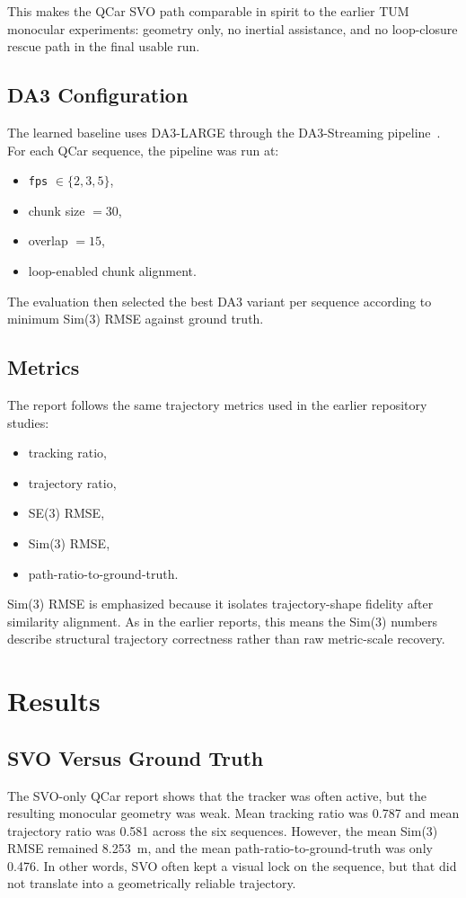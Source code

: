 \documentclass[conference]{IEEEtran}
\begin{document}
This makes the QCar SVO path comparable in spirit to the earlier TUM monocular experiments: geometry only, no inertial assistance, and no loop-closure rescue path in the final usable run.

\subsection{DA3 Configuration}
The learned baseline uses DA3-LARGE through the DA3-Streaming pipeline~\cite{lin2025depthanything3}. For each QCar sequence, the pipeline was run at:
\begin{itemize}
\item \texttt{fps} $\in \{2,3,5\}$,
\item chunk size $= 30$,
\item overlap $= 15$,
\item loop-enabled chunk alignment.
\end{itemize}

The evaluation then selected the best DA3 variant per sequence according to minimum Sim(3) RMSE against ground truth.

\subsection{Metrics}
The report follows the same trajectory metrics used in the earlier repository studies:
\begin{itemize}
\item tracking ratio,
\item trajectory ratio,
\item SE(3) RMSE,
\item Sim(3) RMSE,
\item path-ratio-to-ground-truth.
\end{itemize}

Sim(3) RMSE is emphasized because it isolates trajectory-shape fidelity after similarity alignment. As in the earlier reports, this means the Sim(3) numbers describe structural trajectory correctness rather than raw metric-scale recovery.

\section{Results}

\subsection{SVO Versus Ground Truth}
The SVO-only QCar report shows that the tracker was often active, but the resulting monocular geometry was weak. Mean tracking ratio was 0.787 and mean trajectory ratio was 0.581 across the six sequences. However, the mean Sim(3) RMSE remained 8.253~m, and the mean path-ratio-to-ground-truth was only 0.476. In other words, SVO often kept a visual lock on the sequence, but that did not translate into a geometrically reliable trajectory.
\end{document}
